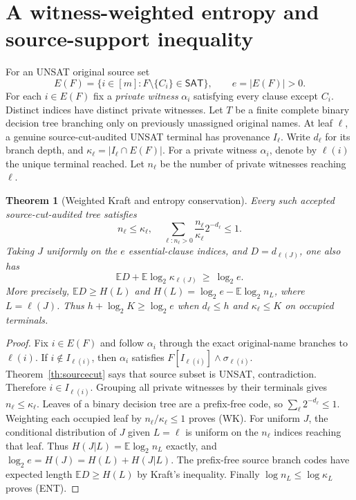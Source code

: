 \documentclass[11pt]{article}
\newtheorem{theorem}{Theorem}
\newcommand{\SAT}{\mathsf{SAT}}
\begin{document}
\section{A witness-weighted entropy and source-support inequality}
For an UNSAT original source set
\[
E(F)=\{i\in[m]:F\setminus\{C_i\}\in\SAT\},
\qquad e=|E(F)|>0.
\]
For each $i\in E(F)$ fix a \emph{private witness} $\alpha_i$
satisfying every clause except $C_i$. Distinct indices have
distinct private witnesses. Let $T$ be a finite complete
binary decision tree branching only on previously unassigned
original names. At leaf $\ell$, a genuine source-cut-audited
UNSAT terminal has provenance $I_\ell$. Write $d_\ell$ for its
branch depth, and $\kappa_\ell=|I_\ell\cap E(F)|$.
For a private witness $\alpha_i$, denote by $\ell(i)$ the
unique terminal reached. Let $n_\ell$ be the number of private
witnesses reaching $\ell$.

\begin{theorem}[Weighted Kraft and entropy conservation]\label{th:entropy}
Every such accepted source-cut-audited tree satisfies
\[
\boxed{\quad
 n_\ell\le\kappa_\ell,\quad
 \sum_{\ell:n_\ell>0}
 \frac{n_\ell}{\kappa_\ell}2^{-d_\ell}\le1.\quad} \tag{WK}
\]
Taking $J$ uniformly on the $e$ essential-clause indices,
and $D=d_{\ell(J)}$, one also has
\[
\boxed{\quad
 \mathbb E D+
 \mathbb E\log_2\kappa_{\ell(J)}
 \ \ge\ \log_2 e. \quad} \tag{ENT}
\]
More precisely,
$\mathbb ED\ge H(L)$ and
$H(L)=\log_2e-\mathbb E\log_2 n_L$, where $L=\ell(J)$.
Thus $h+\log_2K\ge\log_2e$ when $d_\ell\le h$
and $\kappa_\ell\le K$ on occupied terminals.
\end{theorem}
\begin{proof}
Fix $i\in E(F)$ and follow $\alpha_i$ through the exact
original-name branches to $\ell(i)$. If $i\notin I_{\ell(i)}$,
then $\alpha_i$ satisfies $F[I_{\ell(i)}]\land\sigma_{\ell(i)}$.
Theorem~\ref{th:sourcecut} says that source subset is UNSAT,
contradiction. Therefore $i\in I_{\ell(i)}$.
Grouping all private witnesses by their terminals gives
$n_\ell\le\kappa_\ell$.
Leaves of a binary decision tree are a prefix-free code, so
$\sum_\ell 2^{-d_\ell}\le1$. Weighting each occupied leaf by
$n_\ell/\kappa_\ell\le1$ proves (WK).
For uniform $J$, the conditional distribution of $J$
given $L=\ell$ is uniform on the $n_\ell$ indices reaching
that leaf. Thus $H(J|L)=\mathbb E\log_2 n_L$ exactly,
and $\log_2 e=H(J)=H(L)+H(J|L)$.
The prefix-free source branch codes have expected length
$\mathbb E D\ge H(L)$ by Kraft's inequality. Finally
$\log n_L\le\log\kappa_L$ proves (ENT).
\end{proof}
\end{document}
